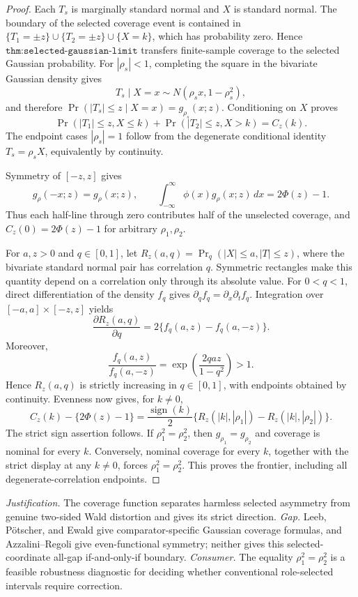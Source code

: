 \documentclass{article}
\begin{document}
\begin{proof}
Each \(T_s\) is marginally standard normal and \(X\) is standard normal.  The boundary of the selected coverage event is contained in \(\{T_1=\pm z\}\cup\{T_2=\pm z\}\cup\{X=k\}\), which has probability zero.  Hence \(\texttt{thm:selected-gaussian-limit}\) transfers finite-sample coverage to the selected Gaussian probability.  For \(|\rho_s|<1\), completing the square in the bivariate Gaussian density gives
\[
 T_s\mid X=x\sim N(\rho_sx,1-\rho_s^2),
\]
and therefore \(\Pr(|T_s|\leq z\mid X=x)=g_{\rho_s}(x;z)\).  Conditioning on \(X\) proves
\[
 \Pr(|T_1|\leq z,X\leq k)+\Pr(|T_2|\leq z,X>k)=C_z(k).
\]
The endpoint cases \(|\rho_s|=1\) follow from the degenerate conditional identity \(T_s=\rho_sX\), equivalently by continuity.

Symmetry of \([-z,z]\) gives
\[
 g_\rho(-x;z)=g_\rho(x;z),
 \qquad
 \int_{-\infty}^{\infty}\phi(x)g_\rho(x;z)\,dx=2\Phi(z)-1.
\]
Thus each half-line through zero contributes half of the unselected coverage, and \(C_z(0)=2\Phi(z)-1\) for arbitrary \(\rho_1,\rho_2\).

For \(a,z>0\) and \(q\in[0,1]\), let \(R_z(a,q)=\Pr_q(|X|\leq a,|T|\leq z)\), where the bivariate standard normal pair has correlation \(q\).  Symmetric rectangles make this quantity depend on a correlation only through its absolute value.  For \(0<q<1\), direct differentiation of the density \(f_q\) gives \(\partial_qf_q=\partial_x\partial_tf_q\).  Integration over \([-a,a]\times[-z,z]\) yields
\[
 \frac{\partial R_z(a,q)}{\partial q}
 =2\{f_q(a,z)-f_q(a,-z)\}.
\]
Moreover,
\[
 \frac{f_q(a,z)}{f_q(a,-z)}
 =\exp\left(\frac{2qaz}{1-q^2}\right)>1.
\]
Hence \(R_z(a,q)\) is strictly increasing in \(q\in[0,1]\), with endpoints obtained by continuity.  Evenness now gives, for \(k\ne0\),
\[
 C_z(k)-\{2\Phi(z)-1\}
 =\frac{\operatorname{sign}(k)}2
 \{R_z(|k|,|\rho_1|)-R_z(|k|,|\rho_2|)\}.
\]
The strict sign assertion follows.  If \(\rho_1^2=\rho_2^2\), then \(g_{\rho_1}=g_{\rho_2}\) and coverage is nominal for every \(k\).  Conversely, nominal coverage for every \(k\), together with the strict display at any \(k\ne0\), forces \(\rho_1^2=\rho_2^2\).  This proves the frontier, including all degenerate-correlation endpoints.
\end{proof}
\par\smallskip\noindent \textit{Justification.} The coverage function separates harmless selected asymmetry from genuine two-sided Wald distortion and gives its strict direction. \textit{Gap.} Leeb, Pötscher, and Ewald give comparator-specific Gaussian coverage formulas, and Azzalini--Regoli give even-functional symmetry; neither gives this selected-coordinate all-gap if-and-only-if boundary. \textit{Consumer.} The equality \(\rho_1^2=\rho_2^2\) is a feasible robustness diagnostic for deciding whether conventional role-selected intervals require correction.
\end{document}
